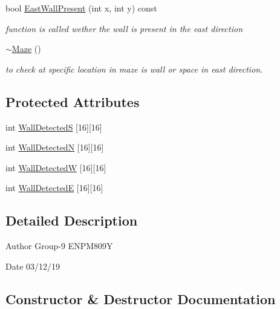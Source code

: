 \begin{DoxyCompactItemize}
bool \hyperlink{classfp_1_1_maze_aed00bd0afedc44d52c1949dd769e68c2}{East\+Wall\+Present} (int x, int y) const
\begin{DoxyCompactList}\small\item\em function is called wether the wall is present in the east direction \end{DoxyCompactList}\item 
\hyperlink{classfp_1_1_maze_ae5f5b10dd66d6a994a40da62fef39577}{$\sim$\+Maze} ()
\begin{DoxyCompactList}\small\item\em to check at specific location in maze is wall or space in east direction. \end{DoxyCompactList}\end{DoxyCompactItemize}
\subsection*{Protected Attributes}
\begin{DoxyCompactItemize}
\item 
int \hyperlink{classfp_1_1_maze_a856f8a1002fdad16684454cb6006646a}{Wall\+DetectedS} \mbox{[}16\mbox{]}\mbox{[}16\mbox{]}
\item 
int \hyperlink{classfp_1_1_maze_aa3538c38fcd8c6cddf3046ec3a33ab2e}{Wall\+DetectedN} \mbox{[}16\mbox{]}\mbox{[}16\mbox{]}
\item 
int \hyperlink{classfp_1_1_maze_ad93e8c8272e3b2f9f693238a95dc38c1}{Wall\+DetectedW} \mbox{[}16\mbox{]}\mbox{[}16\mbox{]}
\item 
int \hyperlink{classfp_1_1_maze_aaa20ddff203607af6ee3c95a00e2d2bf}{Wall\+DetectedE} \mbox{[}16\mbox{]}\mbox{[}16\mbox{]}
\end{DoxyCompactItemize}


\subsection{Detailed Description}
\begin{DoxyAuthor}{Author}
Group-\/9 E\+N\+P\+M809Y 
\end{DoxyAuthor}
\begin{DoxyDate}{Date}
03/12/19 
\end{DoxyDate}


\subsection{Constructor \& Destructor Documentation}
\mbox{\label{classfp_1_1_maze_af090b97595ed34cad9f7c8de9e79a127}} 
